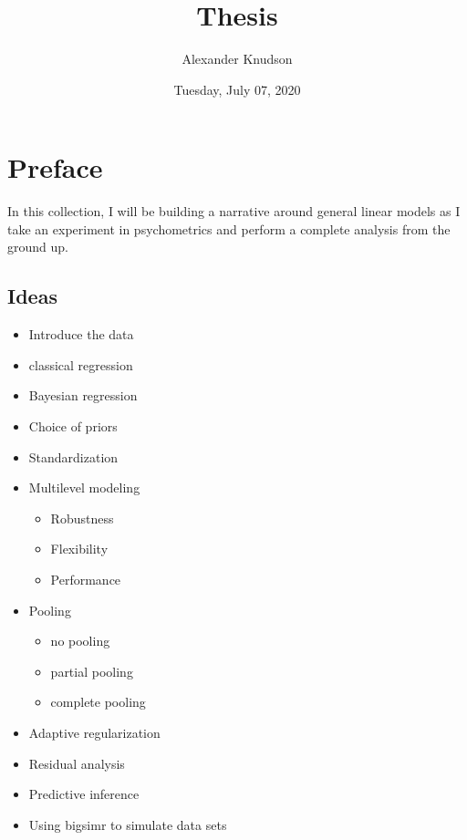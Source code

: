\documentclass[
]{article}
\title{Thesis}
\author{Alexander Knudson}
\date{Tuesday, July 07, 2020}
\providecommand{\tightlist}{%
  \setlength{\itemsep}{0pt}\setlength{\parskip}{0pt}}
\begin{document}
\maketitle

{
\setcounter{tocdepth}{3}
\tableofcontents
}
\hypertarget{preface}{%
\section*{Preface}\label{preface}}


In this collection, I will be building a narrative around general linear models as I take an experiment in psychometrics and perform a complete analysis from the ground up.

\hypertarget{ideas}{%
\subsection*{Ideas}\label{ideas}}


\begin{itemize}
\tightlist
\item
  Introduce the data
\item
  classical regression
\item
  Bayesian regression
\item
  Choice of priors
\item
  Standardization
\item
  Multilevel modeling

  \begin{itemize}
  \tightlist
  \item
    Robustness
  \item
    Flexibility
  \item
    Performance
  \end{itemize}
\item
  Pooling

  \begin{itemize}
  \tightlist
  \item
    no pooling
  \item
    partial pooling
  \item
    complete pooling
  \end{itemize}
\item
  Adaptive regularization
\item
  Residual analysis
\item
  Predictive inference
\item
  Using bigsimr to simulate data sets
\end{itemize}
\end{document}
